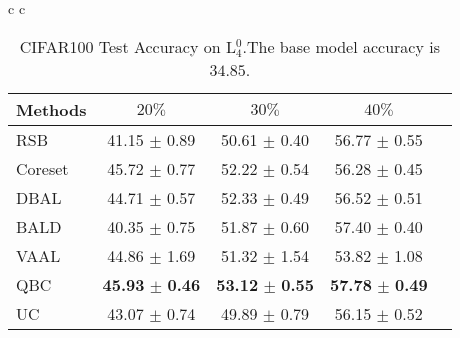 \documentclass[10pt,twocolumn,letterpaper]{article}
\begin{document}
\begin{table}[ht]
\begin{center}
\begin{tabular}{c c}
\begin{minipage}{0.5\linewidth}
{        \begin{tabular}{l|cccc}
        \toprule
        Methods & $20\%$ & $30\%$ & $40\%$ \\
        \midrule
        RSB & 41.15 $\pm$ 0.89 & 50.61 $\pm$ 0.40 & 56.77 $\pm$ 0.55\\
        
        Coreset & 45.72 $\pm$ 0.77 & 52.22 $\pm$ 0.54 & 56.28 $\pm$ 0.45\\
        DBAL & 44.71 $\pm$ 0.57 & 52.33 $\pm$ 0.49 & 56.52 $\pm$ 0.51 \\
        BALD & 40.35 $\pm$ 0.75 & 51.87 $\pm$ 0.60 & 57.40 $\pm$ 0.40\\
        VAAL & 44.86 $\pm$ 1.69 & 51.32 $\pm$ 1.54 & 53.82 $\pm$ 1.08\\
        QBC & \textbf{45.93} $\pm$ \textbf{0.46} & \textbf{53.12} $\pm$ \textbf{0.55} & \textbf{57.78} $\pm$ \textbf{0.49}\\
        UC & 43.07 $\pm$ 0.74 & 49.89 $\pm$ 0.79 & 56.15 $\pm$ 0.52 \\
        \bottomrule
        \end{tabular}}
        
        \caption{CIFAR100 Test Accuracy on L$_{4}^{0}$.The base model accuracy is $34.85$.}
        
        \label{tab:CIFAR100_tab16_supp}
        
    \end{minipage}
    
    
        
        \end{tabular}
        
\end{center}
\end{table}
\end{document}
